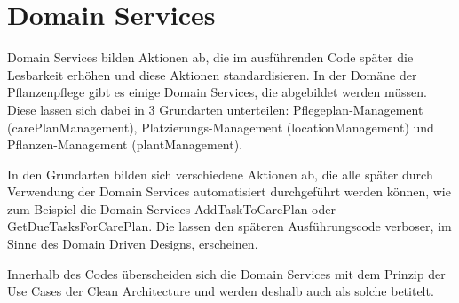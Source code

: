 \section{Domain Services}
Domain Services bilden Aktionen ab, die im ausführenden Code später die Lesbarkeit erhöhen und diese Aktionen standardisieren.  In der Domäne der Pflanzenpflege gibt es einige Domain Services, die abgebildet werden müssen. Diese lassen sich dabei in 3 Grundarten unterteilen: Pflegeplan-Management (carePlanManagement), Platzierungs-Management (locationManagement) und Pflanzen-Management (plantManagement).
\par
In den Grundarten bilden sich verschiedene Aktionen ab, die alle später durch Verwendung der Domain Services automatisiert durchgeführt werden können, wie zum Beispiel die Domain Services AddTaskToCarePlan oder GetDueTasksForCarePlan. Die lassen den späteren Ausführungscode verboser, im Sinne des Domain Driven Designs, erscheinen.
\par
Innerhalb des Codes überscheiden sich die Domain Services mit dem Prinzip der Use Cases der Clean Architecture und werden deshalb auch als solche betitelt.
